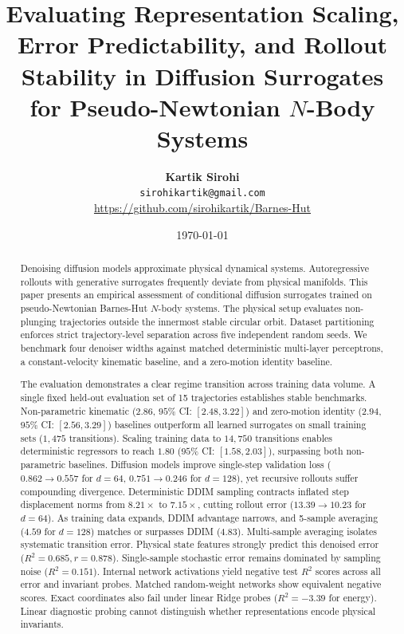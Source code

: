 \documentclass[11pt,a4paper]{article}
\title{\textbf{Evaluating Representation Scaling, Error Predictability, and Rollout Stability in Diffusion Surrogates for Pseudo-Newtonian $N$-Body Systems}}
\author{
    \textbf{Kartik Sirohi} \\
    \texttt{sirohikartik@gmail.com} \\
    \url{https://github.com/sirohikartik/Barnes-Hut}
}
\date{\today}
\begin{document}
\maketitle

\begin{abstract}
Denoising diffusion models approximate physical dynamical systems. Autoregressive rollouts with generative surrogates frequently deviate from physical manifolds. This paper presents an empirical assessment of conditional diffusion surrogates trained on pseudo-Newtonian Barnes-Hut $N$-body systems. The physical setup evaluates non-plunging trajectories outside the innermost stable circular orbit. Dataset partitioning enforces strict trajectory-level separation across five independent random seeds. We benchmark four denoiser widths against matched deterministic multi-layer perceptrons, a constant-velocity kinematic baseline, and a zero-motion identity baseline.

The evaluation demonstrates a clear regime transition across training data volume. A single fixed held-out evaluation set of 15 trajectories establishes stable benchmarks. Non-parametric kinematic ($2.86$, $95\%$ CI: $[2.48, 3.22]$) and zero-motion identity ($2.94$, $95\%$ CI: $[2.56, 3.29]$) baselines outperform all learned surrogates on small training sets ($1,475$ transitions). Scaling training data to $14,750$ transitions enables deterministic regressors to reach $1.80$ ($95\%$ CI: $[1.58, 2.03]$), surpassing both non-parametric baselines. Diffusion models improve single-step validation loss ($0.862 \to 0.557$ for $d=64$, $0.751 \to 0.246$ for $d=128$), yet recursive rollouts suffer compounding divergence. Deterministic DDIM sampling contracts inflated step displacement norms from $8.21\times$ to $7.15\times$, cutting rollout error ($13.39 \to 10.23$ for $d=64$). As training data expands, DDIM advantage narrows, and 5-sample averaging ($4.59$ for $d=128$) matches or surpasses DDIM ($4.83$). Multi-sample averaging isolates systematic transition error. Physical state features strongly predict this denoised error ($R^2 = 0.685, r = 0.878$). Single-sample stochastic error remains dominated by sampling noise ($R^2 = 0.151$). Internal network activations yield negative test $R^2$ scores across all error and invariant probes. Matched random-weight networks show equivalent negative scores. Exact coordinates also fail under linear Ridge probes ($R^2 = -3.39$ for energy). Linear diagnostic probing cannot distinguish whether representations encode physical invariants.
\end{abstract}
\end{document}
